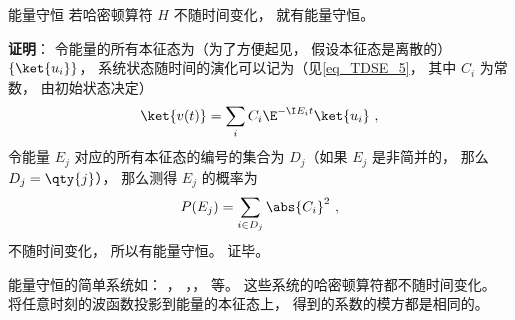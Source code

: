 \begin{theorem}{能量守恒}
若哈密顿算符 $H$ 不随时间变化， 就有能量守恒。
\end{theorem}
\textbf{证明}： 令能量的所有本征态为（为了方便起见， 假设本征态是离散的） $\{\ket{u_i}\}$， 系统状态随时间的演化可以记为（见\autoref{eq_TDSE_5}， 其中 $C_i$ 为常数， 由初始状态决定）
\begin{equation}
\ket{v(t)} = \sum_i C_i \E^{-\I E_i t} \ket{u_i}~,
\end{equation}
令能量 $E_j$ 对应的所有本征态的编号的集合为 $D_j$（如果 $E_j$ 是非简并的， 那么 $D_j = \qty{j}$），%
那么测得 $E_j$ 的概率为
\begin{equation}
P(E_j) = \sum_{i \in D_j} \abs{C_i}^2~,
\end{equation}
不随时间变化， 所以有能量守恒。 证毕。

\begin{example}{}
能量守恒的简单系统如： ， ，， 等。 这些系统的哈密顿算符都不随时间变化。 将任意时刻的波函数投影到能量的本征态上， 得到的系数的模方都是相同的。
\end{example}

